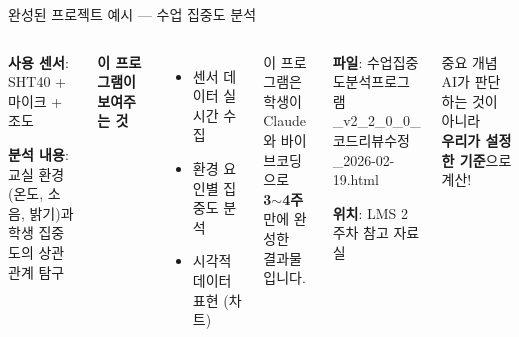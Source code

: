 \documentclass[aspectratio=169]{beamer}
\begin{document}
\begin{frame}{완성된 프로젝트 예시 --- 수업 집중도 분석}
  \begin{columns}
    \begin{tcolorbox}[title=수업 집중도 분석 프로그램]
      \textbf{사용 센서}: SHT40 + 마이크 + 조도
      
      \vspace{0.3em}
      \textbf{분석 내용}:\\
      교실 환경(온도, 소음, 밝기)과\\
      학생 집중도의 상관관계 탐구
    \end{tcolorbox}
    
    \vspace{0.5em}
    
    \textbf{이 프로그램이 보여주는 것}
    \begin{itemize}
      \item 센서 데이터 실시간 수집
      \item 환경 요인별 집중도 분석
      \item 시각적 데이터 표현 (차트)
    \end{itemize}
    
    \begin{tcolorbox}[colframe=accentgreen, title=여러분도 만들 수 있어요!]
      이 프로그램은 학생이\\
      Claude와 바이브코딩으로\\
      \textbf{3$\sim$4주} 만에 완성한\\
      결과물입니다.
    \end{tcolorbox}
    
    \vspace{0.5em}
    
    \begin{tcolorbox}[title=체험 도구 안내]
      \textbf{파일}: 수업집중도분석프로그램\\
      \_v2\_2\_0\_0\_코드리뷰수정\\
      \_2026-02-19.html
      
      \vspace{0.3em}
      \textbf{위치}: LMS 2주차 참고 자료실
    \end{tcolorbox}
    
    \vspace{0.3em}
    
    \begin{alertblock}{중요 개념}
      \small AI가 판단하는 것이 아니라\\
      \textbf{우리가 설정한 기준}으로 계산!
    \end{alertblock}
  \end{columns}
\end{frame}
\end{document}
